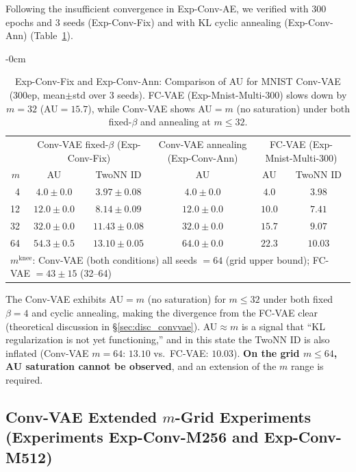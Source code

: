 \documentclass[make,article,submit,pdftex,moreauthors]{Definitions/mdpi}
\newcommand{\mknee}{m^{\mathrm{knee}}}
\begin{document}
Following the insufficient convergence in Exp-Conv-AE, we verified with 300 epochs and 3 seeds (Exp-Conv-Fix)
and with KL cyclic annealing (Exp-Conv-Ann)
(Table~\ref{tab:eh_conv_vae}).

\begin{table}[H]
\begin{adjustwidth}{-\extralength}{0cm}
\centering
\caption{Exp-Conv-Fix and Exp-Conv-Ann: Comparison of AU for MNIST Conv-VAE (300ep, mean$\pm$std over 3 seeds). FC-VAE (Exp-Mnist-Multi-300) slows down by $m=32$ (AU$=15.7$), while Conv-VAE shows AU$=m$ (no saturation) under both fixed-$\beta$ and annealing at $m \leq 32$.}
\label{tab:eh_conv_vae}
\small
\begin{tabular}{r ccc cc}
\toprule
 & \multicolumn{2}{c}{Conv-VAE fixed-$\beta$ (Exp-Conv-Fix)} & \multicolumn{1}{c}{Conv-VAE annealing (Exp-Conv-Ann)} & \multicolumn{2}{c}{FC-VAE (Exp-Mnist-Multi-300)} \\
$m$ & AU & TwoNN ID & AU & AU & TwoNN ID \\
\midrule
 4 & $4.0\pm0.0$ & $3.97\pm0.08$ & $4.0\pm0.0$ & $4.0$ & $3.98$ \\
12 & $12.0\pm0.0$ & $8.14\pm0.09$ & $12.0\pm0.0$ & $10.0$ & $7.41$ \\
32 & $32.0\pm0.0$ & $11.43\pm0.08$ & $32.0\pm0.0$ & $15.7$ & $9.07$ \\
64 & $54.3\pm0.5$ & $13.10\pm0.05$ & $64.0\pm0.0$ & $22.3$ & $10.03$ \\
\midrule
\multicolumn{6}{l}{$\mknee$: Conv-VAE (both conditions) all seeds $=64$ (grid upper bound); FC-VAE $=43\pm15$ (32--64)} \\
\bottomrule
\end{tabular}
\end{adjustwidth}
\end{table}

The Conv-VAE exhibits AU$=m$ (no saturation) for $m \leq 32$ under both fixed $\beta=4$ and cyclic annealing,
making the divergence from the FC-VAE clear (theoretical discussion in \S\ref{sec:disc_convvae}).
AU$\approx m$ is a signal that ``KL regularization is not yet functioning,'' and in this state the TwoNN ID
is also inflated (Conv-VAE $m=64$: $13.10$ vs.\ FC-VAE: $10.03$).
\textbf{On the grid $m \leq 64$, AU saturation cannot be observed}, and an extension of the $m$ range is required.

\subsection{Conv-VAE Extended $m$-Grid Experiments (Experiments Exp-Conv-M256 and Exp-Conv-M512)}\label{sec:exp_en}
\end{document}
